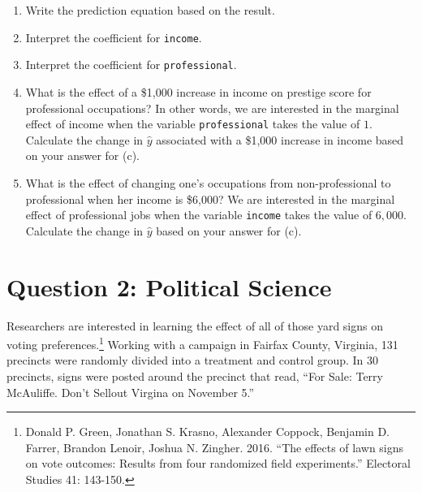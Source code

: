 \documentclass[12pt,letterpaper]{article}
\begin{document}
\begin{enumerate}
	\vspace{13cm}
	\item [(c)]
	Write the prediction equation based on the result.
		
	
\newpage
	\item [(d)]
	Interpret the coefficient for \texttt{income}.
			
	\item [(e)]
	Interpret the coefficient for \texttt{professional}.
	
		
	
	\newpage
	\item [(f)]
	What is the effect of a \$1,000 increase in income on prestige score for professional occupations? In other words, we are interested in the marginal effect of income when the variable \texttt{professional} takes the value of $1$. Calculate the change in $\hat{y}$ associated with a \$1,000 increase in income based on your answer for (c).
	
		
	
	
	\vspace{10cm}
	
	
	\item [(g)]
	What is the effect of changing one's occupations from non-professional to professional when her income is \$6,000? We are interested in the marginal effect of professional jobs when the variable \texttt{income} takes the value of $6,000$. Calculate the change in $\hat{y}$ based on your answer for (c).
	
		
	
	
	
\end{enumerate}

\newpage

\section*{Question 2: Political Science}
\vspace{.25cm}
\noindent 	Researchers are interested in learning the effect of all of those yard signs on voting preferences.\footnote{Donald P. Green, Jonathan	S. Krasno, Alexander Coppock, Benjamin D. Farrer,	Brandon Lenoir, Joshua N. Zingher. 2016. ``The effects of lawn signs on vote outcomes: Results from four randomized field experiments.'' Electoral Studies 41: 143-150. } Working with a campaign in Fairfax County, Virginia, 131 precincts were randomly divided into a treatment and control group. In 30 precincts, signs were posted around the precinct that read, ``For Sale: Terry McAuliffe. Don't Sellout Virgina on November 5.'' \\
\end{document}
